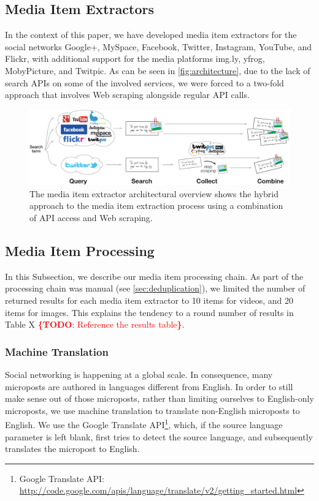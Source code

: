 \documentclass{acm_proc_article-sp}
\newcommand{\todo}[1]{\noindent\textcolor{red}{{\bf \{TODO}: #1{\bf \}}}}
\newcommand{\inlinelistingsize}{\fontsize{8pt}{11pt}}
\let\oldurl\url
\renewcommand{\url}[1]{\inlinelistingsize\oldurl{#1}}
\begin{document}
\subsection{Media Item Extractors}
In the context of this paper, we have developed media item extractors for the social networks Google+, MySpace, Facebook, Twitter, Instagram, YouTube, and Flickr,
with additional support for the media platforms img.ly, yfrog, MobyPicture, and Twitpic.
As can be seen in \autoref{fig:architecture},
due to the lack of search APIs on some of the involved services,
we were forced to a two-fold approach that involves Web scraping alongside regular API calls.

\begin{figure}
\centering
\includegraphics[width=1.0\linewidth]{./resources/architecture.pdf}
\caption{The media item extractor architectural overview shows the hybrid approach to the media item extraction process using a combination of API access and Web scraping.}
\label{fig:architecture}
\end{figure}

\subsection{Media Item Processing}
In this Subsection, we describe our media item processing chain.
As part of the processing chain was manual (see \autoref{sec:deduplication}),
we limited the number of returned results for each media item extractor to 10 items for videos, and 20 items for images.
This explains the tendency to a round number of results in Table X \todo{Reference the results table}.

\subsubsection{Machine Translation}
Social networking is happening at a global scale.
In consequence, many microposts are authored in languages different from English.
In order to still make sense out of those microposts,
rather than limiting ourselves to English-only microposts,
we use machine translation to translate non-English microposts to English.
We use the Google Translate API\footnote{Google Translate API: \url{http://code.google.com/apis/language/translate/v2/getting_started.html}},
which, if the source language parameter is left blank,
first tries to detect the source language,
and subsequently translates the micropost to English.
\end{document}
